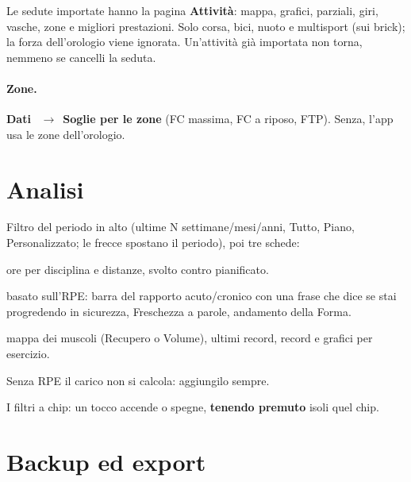 \documentclass[11pt,a4paper]{article}
\newcommand{\ra}{\unskip\nobreak\ $\rightarrow$\ \ignorespaces}            %
\newcommand{\bt}[1]{\textbf{#1}}               %
\begin{document}
Le sedute importate hanno la pagina \bt{Attività}: mappa, grafici, parziali, giri, vasche, zone e
migliori prestazioni. Solo corsa, bici, nuoto e multisport (sui brick); la forza dell'orologio viene
ignorata. Un'attività già importata non torna, nemmeno se cancelli la seduta.

\paragraph{Zone.} \bt{Dati} \ra \bt{Soglie per le zone} (FC massima, FC a riposo, FTP).
Senza, l'app usa le zone dell'orologio.

\section{Analisi}\label{sec:analisi}

Filtro del periodo in alto (ultime N settimane/mesi/anni, Tutto, Piano, Personalizzato; le frecce
spostano il periodo), poi tre schede:

\begin{description}[leftmargin=0pt]
  \item[Volumi] ore per disciplina e distanze, svolto contro pianificato.
  \item[Carico] basato sull'RPE: barra del rapporto acuto/cronico con una frase che dice se stai
    progredendo in sicurezza, Freschezza a parole, andamento della Forma.
  \item[Forza] mappa dei muscoli (Recupero o Volume), ultimi record, record e grafici per esercizio.
\end{description}

\begin{attenzione}
Senza RPE il carico non si calcola: aggiungilo sempre.
\end{attenzione}

I filtri a chip: un tocco accende o spegne, \bt{tenendo premuto} isoli quel chip.

\section{Backup ed export}\label{sec:backup}
\end{document}
